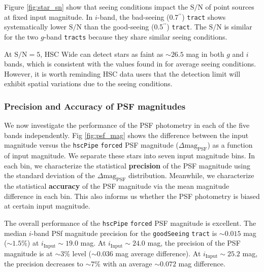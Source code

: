 \documentclass[useamsfonts]{pasj01}
\def\asec{$^{\prime\prime}$}
\def\hscpipe{\texttt{hscPipe}}
\def\forced{\texttt{forced}}
\def\tract{\texttt{tract}}
\def\tracts{\texttt{tracts}}
\def\s2n{{$\mathrm{S}/\mathrm{N}$}}
\begin{document}
    Figure \ref{fig:star_sn} show that seeing conditions impact the \s2n{} of point
    sources at fixed input magnitude.
    In $i$-band, the bad-seeing (0.7\asec{}) \tract{} shows systematically
    lower \s2n{} than the good-seeing (0.5\asec{}) \tract{}.
    The \s2n{} is similar for the two $g$-band \tracts{} because they share similar 
    seeing conditions. 

    At \s2n{}$=5$, HSC Wide can detect stars as faint as ${\sim}26.5$ mag in both $g$ 
    and $i$ bands, which is consistent with the values found in \citet{HSCDR1} for 
    average seeing conditions.
    However, it is worth reminding HSC data users that the detection
    limit will exhibit spatial variations due to the seeing conditions.

\subsubsection{Precision and Accuracy of PSF magnitudes}

    We now investigate the performance of the PSF photometry in each of the five bands
    independently. 
    Fig \ref{fig:psf_mag} shows the difference between the input magnitude versus the
    \hscpipe{} \forced{} PSF magnitude ($\Delta \mathrm{mag}_{\mathrm{PSF}}$) as a 
    function of input magnitude. 
    We separate these stars into seven input magnitude bins.  
    In each bin, we characterize the statistical \textbf{precision} of the PSF 
    magnitude using the standard deviation of the $\Delta \mathrm{mag}_{\mathrm{PSF}}$ 
    distribution.
    Meanwhile, we characterize the statistical \textbf{accuracy} of the PSF magnitude 
    via the mean magnitude difference in each bin. 
    This also informs us whether the PSF photometry is biased at certain input 
    magnitude.
    
    The overall performance of the \hscpipe{} \forced{} PSF magnitude is excellent. 
    The median $i$-band PSf magnitude precision for the \texttt{goodSeeing} \tract{} 
    is ${\sim}0.015$ mag (${\sim}1.5$\%) at $i_{\mathrm{Input}}{\sim}19.0$ mag. 
    At $i_{\mathrm{Input}}{\sim}24.0$ mag, the precision of the PSF magnitude is 
    at ${\sim}3$\% level (${\sim}0.036$ mag average difference).
    At $i_{\mathrm{Input}}{\sim}25.2$ mag, the precision decreases to
    ${\sim}7$\% with an average ${\sim}0.072$ mag difference.
    
\end{document}
